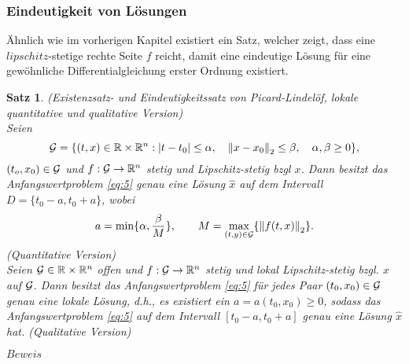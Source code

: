 \documentclass[
    paper=a4, %
    fontsize=10pt,  %
]{article}         %
\newtheorem{satz}[theorem]{Satz}
\begin{document}
    \subsubsection{Eindeutigkeit von Lösungen}
    Ähnlich wie im vorherigen Kapitel existiert ein Satz, welcher zeigt, dass eine $lipschitz$-stetige
    \cite{LipschitzStetigkeitSerloMathe} rechte Seite $f$ reicht, damit eine eindeutige Lösung für eine
    gewöhnliche Differentialgleichung erster Ordnung existiert.
    \begin{satz}
        (Existenzsatz- und Eindeutigkeitssatz von Picard-Lindelöf, lokale quantitative und qualitative Version) \\
        Seien
        \[
            {\cal G}=\{(t,x) \in \mathbb{R} \times \mathbb{R}^{n}: |t-t_{0}| \leq \alpha, \quad
            \left\lVert x-x_{0} \right\rVert _{2} \leq\beta, \quad \alpha,\beta \geq 0 \},
        \]
        $(t_{o},x_{0})\in {\cal G}$ und $f:{\cal G} \rightarrow \mathbb{R}^{n}$ stetig und Lipschitz-stetig bzgl $x$.
        Dann besitzt das Anfangswertproblem \eqref{eq:5} genau eine Lösung $\hat{x}$ auf dem Intervall
        $D=\{t_{0}-a,t_{0}+a\}$, wobei
        \[
            a=\min\{\alpha, \frac{\beta}{M}\}, \qquad M= \max_{(t,y)\in {\cal G}}\{\left\lVert f(t,x)\right\rVert_{2} \}
            .
        \](Quantitative Version)\\
        Seien ${\cal G}\in \mathbb{R} \times \mathbb{R}^{n}$ offen und $f:{\cal G} \rightarrow \mathbb{R}^{n}$ stetig und lokal
        Lipschitz-stetig bzgl. $x$ auf $\cal{G}$. Dann besitzt das Anfangswertproblem \eqref{eq:5} für jedes Paar
        $(t_{0},x_{0}) \in {\cal G}$ genau eine lokale Lösung, d.h., es existiert ein $a=a(t_{0},x_{0}) \geq 0$, sodass
        das Anfangswertproblem \eqref{eq:5} auf dem Intervall $[t_{0}-a,t_{0}+a]$ genau eine Lösung $\hat{x}$ hat.
        (Qualitative Version)
    \end{satz}
    $Beweis$ \cite[56-58]{beckGewohnlicheDifferentialgleichungen2018}
    \cite{stykelSkriptZurVorlesung2020}
\end{document}
